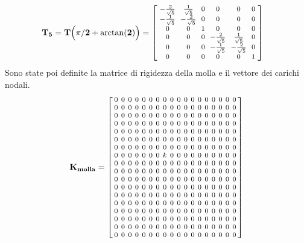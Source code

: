 \begin{align*}
\mathbf{T_5}=\mathbf{T\Big(\pi/2 + \arctan(2)\Big)} &=
{\arraycolsep=3pt\medmuskip=0.8mu\footnotesize
\left[
\begin{array}{cccccc}
 -\frac{2}{\sqrt{5}} & \frac{1}{\sqrt{5}} & 0 & 0 & 0 & 0 \\
 -\frac{1}{\sqrt{5}} & -\frac{2}{\sqrt{5}} & 0 & 0 & 0 & 0 \\
 0 & 0 & 1 & 0 & 0 & 0 \\
 0 & 0 & 0 & -\frac{2}{\sqrt{5}} & \frac{1}{\sqrt{5}} & 0 \\
 0 & 0 & 0 & -\frac{1}{\sqrt{5}} & -\frac{2}{\sqrt{5}} & 0 \\
 0 & 0 & 0 & 0 & 0 & 1 \\
\end{array}
\right]
 }
 \end{align*}
 Sono state poi definite la matrice di rigidezza della molla e il vettore dei carichi nodali.
%
\[
\mathbf{K_{molla}} =
{\arraycolsep=2pt\medmuskip=0.8mu\footnotesize
\left[
\begin{array}{cccccccccccccccccc}
 0 & 0 & 0 & 0 & 0 & 0 & 0 & 0 & 0 & 0 & 0 & 0 & 0 & 0 & 0 & 0 & 0 & 0 \\
 0 & 0 & 0 & 0 & 0 & 0 & 0 & 0 & 0 & 0 & 0 & 0 & 0 & 0 & 0 & 0 & 0 & 0 \\
 0 & 0 & 0 & 0 & 0 & 0 & 0 & 0 & 0 & 0 & 0 & 0 & 0 & 0 & 0 & 0 & 0 & 0 \\
 0 & 0 & 0 & 0 & 0 & 0 & 0 & 0 & 0 & 0 & 0 & 0 & 0 & 0 & 0 & 0 & 0 & 0 \\
 0 & 0 & 0 & 0 & 0 & 0 & 0 & 0 & 0 & 0 & 0 & 0 & 0 & 0 & 0 & 0 & 0 & 0 \\
 0 & 0 & 0 & 0 & 0 & 0 & 0 & 0 & 0 & 0 & 0 & 0 & 0 & 0 & 0 & 0 & 0 & 0 \\
 0 & 0 & 0 & 0 & 0 & 0 & 0 & 0 & 0 & 0 & 0 & 0 & 0 & 0 & 0 & 0 & 0 & 0 \\
 0 & 0 & 0 & 0 & 0 & 0 & 0 & k & 0 & 0 & 0 & 0 & 0 & 0 & 0 & 0 & 0 & 0 \\
 0 & 0 & 0 & 0 & 0 & 0 & 0 & 0 & 0 & 0 & 0 & 0 & 0 & 0 & 0 & 0 & 0 & 0 \\
 0 & 0 & 0 & 0 & 0 & 0 & 0 & 0 & 0 & 0 & 0 & 0 & 0 & 0 & 0 & 0 & 0 & 0 \\
 0 & 0 & 0 & 0 & 0 & 0 & 0 & 0 & 0 & 0 & 0 & 0 & 0 & 0 & 0 & 0 & 0 & 0 \\
 0 & 0 & 0 & 0 & 0 & 0 & 0 & 0 & 0 & 0 & 0 & 0 & 0 & 0 & 0 & 0 & 0 & 0 \\
 0 & 0 & 0 & 0 & 0 & 0 & 0 & 0 & 0 & 0 & 0 & 0 & 0 & 0 & 0 & 0 & 0 & 0 \\
 0 & 0 & 0 & 0 & 0 & 0 & 0 & 0 & 0 & 0 & 0 & 0 & 0 & 0 & 0 & 0 & 0 & 0 \\
 0 & 0 & 0 & 0 & 0 & 0 & 0 & 0 & 0 & 0 & 0 & 0 & 0 & 0 & 0 & 0 & 0 & 0 \\
 0 & 0 & 0 & 0 & 0 & 0 & 0 & 0 & 0 & 0 & 0 & 0 & 0 & 0 & 0 & 0 & 0 & 0 \\
 0 & 0 & 0 & 0 & 0 & 0 & 0 & 0 & 0 & 0 & 0 & 0 & 0 & 0 & 0 & 0 & 0 & 0 \\
 0 & 0 & 0 & 0 & 0 & 0 & 0 & 0 & 0 & 0 & 0 & 0 & 0 & 0 & 0 & 0 & 0 & 0 \\
\end{array}
\right]
}
\]
